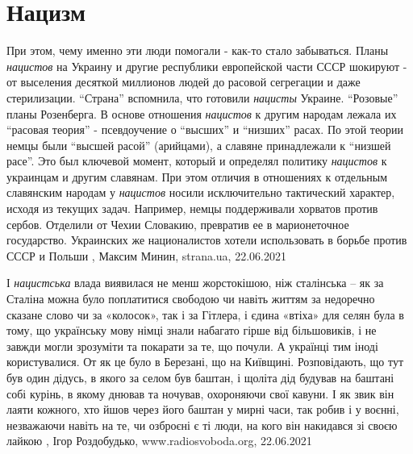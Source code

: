  
 
 
 
 
\chapter{Нацизм}

При этом, чему именно эти люди помогали - как-то стало забываться. Планы
\emph{нацистов} на Украину и другие республики европейской части СССР шокируют - от
выселения десяткой миллионов людей до расовой сегрегации и даже стерилизации.
\enquote{Страна} вспомнила, что готовили \emph{нацисты} Украине.  \enquote{Розовые}
планы Розенберга.  В основе отношения \emph{нацистов} к другим народам лежала их
\enquote{расовая теория} - псевдоучение о \enquote{высших} и \enquote{низших}
расах. По этой теории немцы были \enquote{высшей расой} (арийцами), а славяне
принадлежали к \enquote{низшей расе}.  Это был ключевой момент, который и
определял политику \emph{нацистов} к украинцам и другим славянам.  При этом отличия в
отношениях к отдельным славянским народам у \emph{нацистов} носили исключительно
тактический характер, исходя из текущих задач. Например, немцы поддерживали
хорватов против сербов. Отделили от Чехии Словакию, превратив ее в
марионеточное государство. Украинских же националистов хотели использовать в
борьбе против СССР и Польши
, 
Максим Минин, strana.ua, 22.06.2021


І \emph{нацистська} влада виявилася не менш жорстокішою, ніж сталінська – як за
Сталіна можна було поплатитися свободою чи навіть життям за недоречно сказане
слово чи за «колосок», так і за Гітлера, і єдина «втіха» для селян була в тому,
що українську мову німці знали набагато гірше від більшовиків, і не завжди
могли зрозуміти та покарати за те, що почули. А українці тим іноді
користувалися. От як це було в Березані, що на Київщині.  Розповідають, що тут
був один дідусь, в якого за селом був баштан, і щоліта дід будував на баштані
собі курінь, в якому днював та ночував, охороняючи свої кавуни. І як звик він
лаяти кожного, хто йшов через його баштан у мирні часи, так робив і у воєнні,
незважаючи навіть на те, чи озброєні є ті люди, на кого він накидався зі своєю
лайкою
, 
Ігор Роздобудько, www.radiosvoboda.org, 22.06.2021

